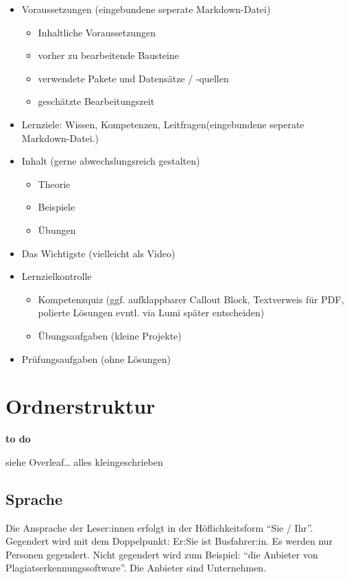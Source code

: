 \documentclass[
  letterpaper,
  DIV=11]{scrartcl}
\begin{document}
\begin{itemize}
\item
  Voraussetzungen (eingebundene seperate Markdown-Datei)

  \begin{itemize}
  \item
    Inhaltliche Voraussetzungen
  \item
    vorher zu bearbeitende Bausteine
  \item
    verwendete Pakete und Datensätze / -quellen
  \item
    geschätzte Bearbeitungszeit
  \end{itemize}
\item
  Lernziele: Wissen, Kompetenzen, Leitfragen(eingebundene seperate
  Markdown-Datei.)
\item
  Inhalt (gerne abwechslungsreich gestalten)

  \begin{itemize}
  \item
    Theorie
  \item
    Beispiele
  \item
    Übungen
  \end{itemize}
\item
  Das Wichtigste (vielleicht als Video)
\item
  Lernzielkontrolle

  \begin{itemize}
  \item
    Kompetenzquiz (ggf. aufklappbarer Callout Block, Textverweis für
    PDF, polierte Lösungen evntl. via Lumi später entscheiden)
  \item
    Übungsaufgaben (kleine Projekte)
  \end{itemize}
\item
  Prüfungsaufgaben (ohne Lösungen)
\end{itemize}

\section{Ordnerstruktur}\label{sec-Ordnerstruktur}

\textbf{to do}

siehe Overleaf\ldots{} alles kleingeschrieben

\subsection{Sprache}\label{sprache}

Die Ansprache der Leser:innen erfolgt in der Höflichkeitsform ``Sie /
Ihr''. Gegendert wird mit dem Doppelpunkt: Er:Sie ist Busfahrer:in. Es
werden nur Personen gegendert. Nicht gegendert wird zum Beispiel: ``die
Anbieter von Plagiatserkennungssoftware''. Die Anbieter sind
Unternehmen.
\end{document}
